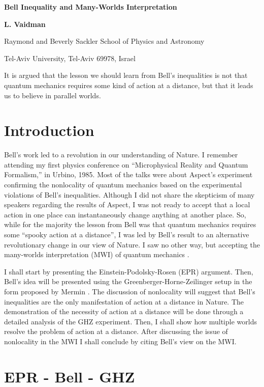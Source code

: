 \documentclass[11pt]{article}
\begin{document}
\vskip 20pt

\centerline{\bf \large Bell Inequality and  Many-Worlds Interpretation}
\vskip 30pt

 \centerline{\bf L. Vaidman}
\centerline{ Raymond and Beverly Sackler School of Physics and Astronomy}
 \centerline{Tel-Aviv University, Tel-Aviv 69978, Israel}
\vskip 20pt
It is argued that the lesson we should learn from Bell's inequalities is not that quantum mechanics requires some kind of action at a distance, but that it leads us to believe in parallel worlds.

\section{Introduction}

  Bell's work \cite{Bell64} led to a revolution in our understanding of Nature.
I remember   attending my first physics conference on ``Microphysical Reality and Quantum Formalism,'' in Urbino, 1985. Most of the talks were about  Aspect's experiment \cite{Aspect} confirming the nonlocality of quantum mechanics based on the experimental violations of Bell's inequalities. Although I did not share the skepticism of many speakers regarding the results of Aspect, I was not ready to accept that a local action in one place can instantaneously change anything at another place. So, while for the majority the lesson from Bell was that  quantum mechanics requires some ``spooky action at a distance'', I was led by Bell's result to an alternative revolutionary change in our view of Nature. I saw no other way, but accepting  the many-worlds interpretation (MWI) of quantum mechanics \cite{Eve,SEP}.

I shall start by presenting the Einstein-Podolsky-Rosen (EPR) \cite{EPR} argument. Then, Bell's idea will be presented using the Greenberger-Horne-Zeilinger setup \cite{GHZ} in the form proposed by Mermin \cite{Mermin,myGHZ}.  The discussion of nonlocality will suggest that Bell's inequalities are the only manifestation of action at a distance in Nature. The demonstration of the necessity of action at a distance  will be done through a detailed analysis of the GHZ experiment. Then, I shall show  how multiple worlds resolve the problem of action at a distance. After discussing the issue of nonlocality in the MWI  I shall conclude by  citing Bell's view on the MWI.


\section{EPR - Bell - GHZ }\label{E-B-G}
\end{document}

